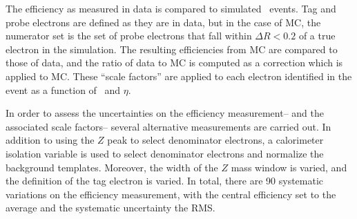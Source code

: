 The efficiency as measured in data is compared to simulated
\Zee~events. Tag and probe electrons are defined as they are in data,
but in the case of MC, the numerator set is the set of probe electrons
that fall within $\Delta{R} < 0.2$ of a true electron in the
simulation. The resulting efficiencies from MC are compared to those
of data, and the ratio of data to MC is computed as a correction which
is applied to MC. These ``scale factors'' are applied to each electron
identified in the event as a function of \et~and $\eta$.

In order to assess the uncertainties on the efficiency measurement--
and the associated scale factors-- several alternative measurements
are carried out. In addition to using the $Z$ peak to select
denominator electrons, a calorimeter isolation variable is used to
select denominator electrons and normalize the background
templates. Moreover, the width of the $Z$ mass window is varied, and the definition
of the tag electron is varied. In total, there are 90 systematic
variations on the efficiency measurement, with the central efficiency
set to the average and the systematic uncertainty the RMS. 
